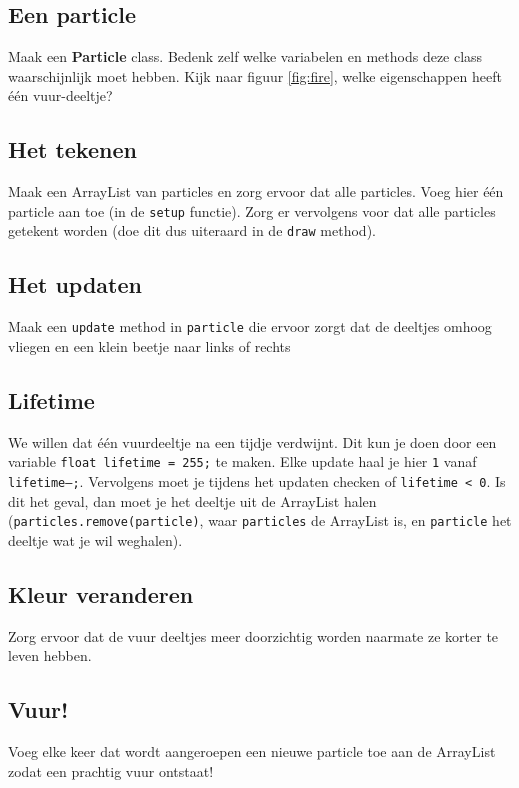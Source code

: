 \documentclass{../qh_exercise}
\begin{document}
\subsection{Een particle}
Maak een \textbf{Particle} class. Bedenk zelf welke variabelen en methods deze class waarschijnlijk moet hebben. Kijk naar figuur \ref{fig:fire}, welke eigenschappen heeft \'e\'en vuur-deeltje?

\subsection{Het tekenen}
Maak een ArrayList van particles en zorg ervoor dat alle particles.
Voeg hier \'e\'en particle aan toe (in de \texttt{setup} functie).
Zorg er vervolgens voor dat alle particles getekent worden (doe dit dus uiteraard in de \texttt{draw} method).

\subsection{Het updaten}
Maak een \texttt{update} method in \texttt{particle} die ervoor zorgt dat de deeltjes omhoog vliegen en een klein beetje naar links of rechts

\subsection{Lifetime}
We willen dat \'e\'en vuurdeeltje na een tijdje verdwijnt. Dit kun je doen door een variable \texttt{float lifetime = 255;} te maken. Elke update haal je hier \texttt{1} vanaf \texttt{lifetime--;}. Vervolgens moet je tijdens het updaten checken of \texttt{lifetime < 0}. Is dit het geval, dan moet je het deeltje uit de ArrayList halen (\texttt{particles.remove(particle)}, waar \texttt{particles} de ArrayList is, en \texttt{particle} het deeltje wat je wil weghalen).

\subsection{Kleur veranderen}
Zorg ervoor dat de vuur deeltjes meer doorzichtig worden naarmate ze korter te leven hebben.

\subsection{Vuur!}
Voeg elke keer dat  wordt aangeroepen een nieuwe particle toe aan de ArrayList zodat een prachtig vuur ontstaat!
\end{document}
